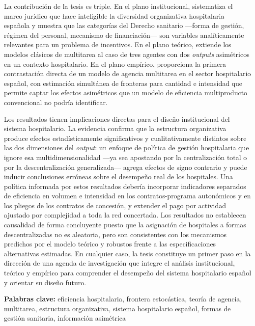 La contribución de la tesis es triple. En el plano institucional, 
sistematiza el marco jurídico que hace inteligible la diversidad 
organizativa hospitalaria española y muestra que las categorías del 
Derecho sanitario ---forma de gestión, régimen del personal, mecanismo 
de financiación--- son variables analíticamente relevantes para un 
problema de incentivos. En el plano teórico, extiende los modelos 
clásicos de multitarea al caso de tres agentes con dos \textit{outputs} 
asimétricos en un contexto hospitalario. En el plano empírico, 
proporciona la primera contrastación directa de un modelo de agencia 
multitarea en el sector hospitalario español, con estimación simultánea 
de fronteras para cantidad e intensidad que permite captar los efectos 
asimétricos que un modelo de eficiencia multiproducto convencional 
no podría identificar.

Los resultados tienen implicaciones directas para el diseño 
institucional del sistema hospitalario. La evidencia confirma que 
la estructura organizativa produce efectos estadísticamente 
significativos y cualitativamente distintos sobre las dos dimensiones 
del \textit{output}: un enfoque de política de gestión hospitalaria 
que ignore esa multidimensionalidad ---ya sea apostando por la 
centralización total o por la descentralización generalizada--- agrega 
efectos de signo contrario y puede inducir conclusiones erróneas sobre 
el desempeño real de los hospitales. Una política informada por estos 
resultados debería incorporar indicadores separados de eficiencia en 
volumen e intensidad en los contratos-programa autonómicos y en los 
pliegos de los contratos de concesión, y extender el pago por actividad 
ajustado por complejidad a toda la red concertada. Los resultados no 
establecen causalidad de forma concluyente puesto que la asignación de 
hospitales a formas descentralizadas no es aleatoria, pero son 
consistentes con los mecanismos predichos por el modelo teórico y 
robustos frente a las especificaciones alternativas estimadas. En cualquier caso, la tesis constituye un primer paso en la dirección de una agenda de investigación que integre el análisis institucional, teórico y empírico para comprender el desempeño del sistema hospitalario español y orientar su diseño futuro.

\medskip
\noindent\textbf{Palabras clave:} eficiencia hospitalaria, frontera estocástica, teoría de agencia, multitarea, estructura organizativa, sistema hospitalario español, formas de gestión sanitaria, información asimétrica


